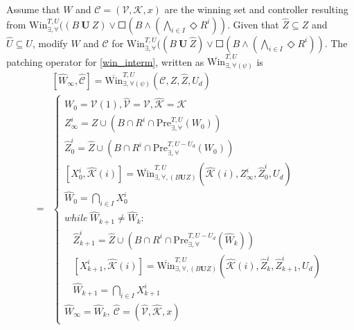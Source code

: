 Assume that $ W $ and $ \mathcal{C}=(\mathcal{V},\mathcal{K},x) $ are the winning set and controller resulting from $\text{Win}_{\exists,\forall}^{T,U}((B\mathbf{\ U\ }Z)\vee \Square(B\wedge (\bigwedge_{i\in I} \Diamond R^i)) $. Given that $ \widehat{Z}\subseteq Z $ and $ \widehat{U}\subseteq U $, modify $ W $ and $ \mathcal{C} $ for $\text{Win}_{\exists,\forall}^{T,U}((B\mathbf{\ U\ }\widehat{Z})\vee \Square(B\wedge (\bigwedge_{i\in I} \Diamond R^i)) $. The patching operator for \eqref{win_interm}, written as $\overline{\text{Win}}^{T, U}_{\exists,\forall (\psi)}  $ is 
\begin{align}
&[\widehat{W}_{\infty},\widehat{\mathcal{C}}]=\overline{\text{Win}}^{T, U}_{\exists,\forall (\psi)} (\mathcal{C},Z,\widehat{Z},U_d)\\
=&\begin{cases}
W_0 = \mathcal{V}(1),\widehat{\mathcal{V}}=\mathcal{V},\widehat{\mathcal{K}}=\mathcal{K}\\
Z_{\infty}^i = Z\cup (B\cap R^i\cap \text{Pre}_{\exists, \forall}^{T,U}(W_0))\\
\widehat{Z}_{0}^i = \widehat{Z}\cup (B\cap R^i\cap \text{Pre}_{\exists, \forall}^{T,U-U_d}(W_0))\\
[X^i_0,\widehat{\mathcal{K}}(i)] = \overline{\text{Win}}^{T,U}_{\exists,\forall, (B\mathbf{U}Z)}(\widehat{\mathcal{K}}(i),Z_\infty^i,\widehat{Z}_0^i, U_d)\\
\widehat{W}_{0} = \bigcap_{i\in I} X^i_0\\
while\ \widehat{W}_{k+1}\not=\widehat{W}_k:\\
\ \ \ \ \widehat{Z}_{k+1}^i = \widehat{Z} \cup (B\cap R^i\cap \text{Pre}_{\exists, \forall}^{T,U-U_d}(\widehat{W}_k))\\
\ \ \ \ [X^i_{k+1},\widehat{\mathcal{K}}(i)]=\overline{\text{Win}}^{T,U}_{\exists,\forall,(B\mathbf{U}Z)}(\widehat{\mathcal{K}}(i),\widehat{Z}_k^i,\widehat{Z}_{k+1}^i, U_d)\\
\ \ \ \ \widehat{W}_{k+1} = \bigcap_{i\in I} X^i_{k+1}\\
\widehat{W}_\infty = \widehat{W}_k,\ \widehat{\mathcal{C}}=(\widehat{\mathcal{V}},\widehat{\mathcal{K}},x)
\end{cases}\label{patch_interm}
\end{align}

